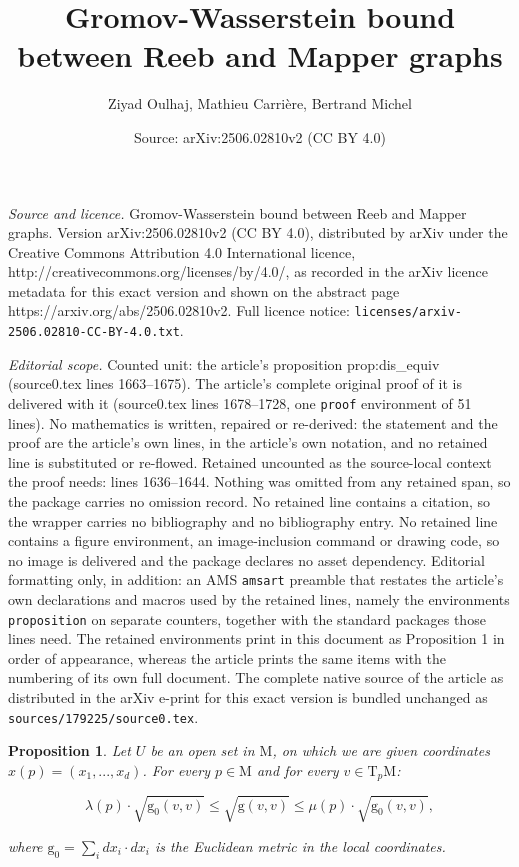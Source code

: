 \documentclass[10pt,a4paper]{amsart}
\title{Gromov-Wasserstein bound between Reeb and Mapper graphs}
\author{Ziyad Oulhaj, Mathieu Carri\`ere, Bertrand Michel}
\date{Source: arXiv:2506.02810v2 (CC BY 4.0)}
\newtheorem{proposition}{Proposition}
\newcommand{\g}{\mathrm{g}}
\newcommand{\man}{\mathrm{M}}
\newcommand{\tangent}{\mathrm{T}}
\begin{document}
\maketitle

\noindent\emph{Source and licence.} Gromov-Wasserstein bound between Reeb and Mapper graphs. Version arXiv:2506.02810v2 (CC BY 4.0), distributed by arXiv under the Creative Commons Attribution 4.0 International licence, http://creativecommons.org/licenses/by/4.0/, as recorded in the arXiv licence metadata for this exact version and shown on the abstract page https://arxiv.org/abs/2506.02810v2. Full licence notice: \texttt{licenses/arxiv-2506.02810-CC-BY-4.0.txt}.\par\smallskip

\noindent\textit{Editorial scope.} Counted unit: the article's proposition prop:dis\_equiv (source0.tex lines 1663--1675). The article's complete original proof of it is delivered with it (source0.tex lines 1678--1728, one \texttt{proof} environment of 51 lines). No mathematics is written, repaired or re-derived: the statement and the proof are the article's own lines, in the article's own notation, and no retained line is substituted or re-flowed.  Retained uncounted as the source-local context the proof needs: lines 1636--1644.  Nothing was omitted from any retained span, so the package carries no omission record.  No retained line contains a citation, so the wrapper carries no bibliography and no bibliography entry.  No retained line contains a figure environment, an image-inclusion command or drawing code, so no image is delivered and the package declares no asset dependency.  Editorial formatting only, in addition: an AMS \texttt{amsart} preamble that restates the article's own declarations and macros used by the retained lines, namely the environments \texttt{proposition} on separate counters, together with the standard packages those lines need.  The retained environments print in this document as Proposition 1 in order of appearance, whereas the article prints the same items with the numbering of its own full document.  The complete native source of the article as distributed in the arXiv e-print for this exact version is bundled unchanged as \texttt{sources/179225/source0.tex}.
\begin{proposition}\label{prop:g_equiv}
Let $U$ be an open set in $\man$, on which we are given coordinates $x(p)=(x_1,...,x_d)$. 
%
For every $p\in\man$ and for every $v\in\tangent_p\man$:

$$\lambda(p)\cdot \sqrt{\g_0(v,v)}\leq \sqrt{\g(v,v)}\leq \mu(p)\cdot \sqrt{\g_0(v,v)},$$

where $\g_0=\sum_{i}dx_i\cdot dx_i$ is the Euclidean metric in the local coordinates.
\end{proposition}
\end{document}

